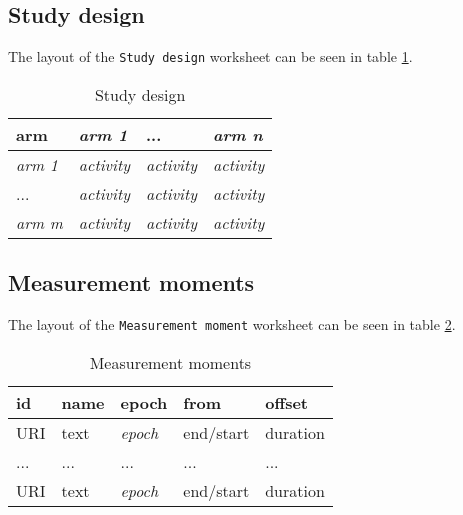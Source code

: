 \documentclass[a4paper,10pt]{article}
\begin{document}
\subsection{Study design}
The layout of the \texttt{Study design} worksheet can be seen in table \ref{table:Study design}.
\begin{table}[!h]
  \centering
  \caption{Study design}
  \label{table:Study design}
  \begin{tabular}{|l|l|l|l|}
    \hline
    \textbf{arm}   & \textit{arm 1}    & ...               & \textit{arm n}    \\ \hline
    \textit{arm 1} & \textit{activity} & \textit{activity} & \textit{activity} \\ \hline
    ...            & \textit{activity} & \textit{activity} & \textit{activity} \\ \hline
    \textit{arm m} & \textit{activity} & \textit{activity} & \textit{activity} \\ \hline
  \end{tabular}
\end{table}

\subsection{Measurement moments}
The layout of the \texttt{Measurement moment} worksheet can be seen in table \ref{table:Measurement moments}.
\begin{table}[!h]
  \centering
  \caption{Measurement moments}
  \label{table:Measurement moments}
  \begin{tabular}{|l|l|l|l|l|}
    \hline
    \textbf{id} & \textbf{name} & \textbf{epoch} & \textbf{from} & \textbf{offset} \\ \hline
    URI         & text          & \textit{epoch} & end/start     & duration        \\ \hline
    ...         & ...           & ...            &  ...          & ...             \\ \hline
    URI         & text          & \textit{epoch} & end/start     & duration        \\ \hline
  \end{tabular}
\end{table}
\end{document}

